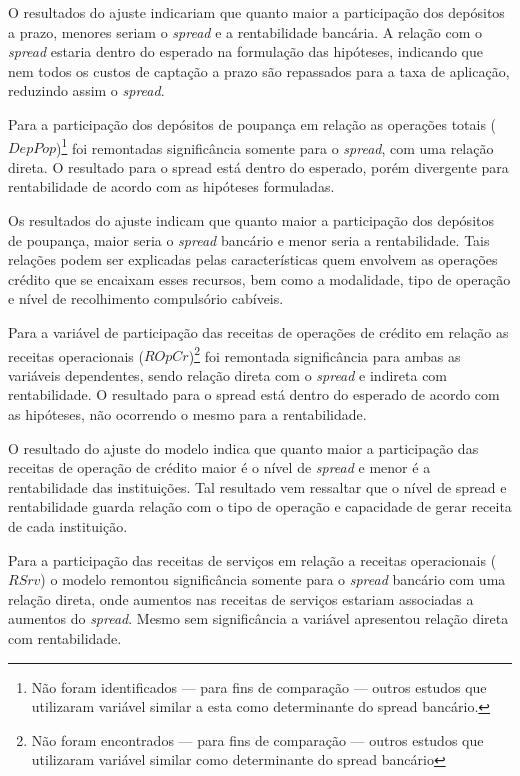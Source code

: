 \documentclass[
  12pt,
  12pt,
  openright,
  oneside,
  a4paper,
  chapter=TITLE,
  section=TITLE,
  subsection=TITLE,
  subsubsection=TITLE,
  english,
  portugues,
  sumario=tradicional]{abntex2}
\begin{document}
O resultados do ajuste indicariam que quanto maior a participação dos depósitos a prazo, menores seriam o \emph{spread} e a rentabilidade bancária. A relação com o \emph{spread} estaria dentro do esperado na formulação das hipóteses, indicando que nem todos os custos de captação a prazo são repassados para a taxa de aplicação, reduzindo assim o \emph{spread}.

Para a participação dos depósitos de poupança em relação as operações totais (\(DepPop\))\footnote{Não foram identificados — para fins de comparação — outros estudos que utilizaram variável similar a esta como determinante do spread bancário.} foi remontadas significância somente para o \emph{spread}, com uma relação direta. O resultado para o spread está dentro do esperado, porém divergente para rentabilidade de acordo com as hipóteses formuladas.

Os resultados do ajuste indicam que quanto maior a participação dos depósitos de poupança, maior seria o \emph{spread} bancário e menor seria a rentabilidade. Tais relações podem ser explicadas pelas características quem envolvem as operações crédito que se encaixam esses recursos, bem como a modalidade, tipo de operação e nível de recolhimento compulsório cabíveis.

Para a variável de participação das receitas de operações de crédito em relação as receitas operacionais (\(ROpCr\))\footnote{Não foram encontrados — para fins de comparação — outros estudos que utilizaram variável similar como determinante do spread bancário} foi remontada significância para ambas as variáveis dependentes, sendo relação direta com o \emph{spread} e indireta com rentabilidade. O resultado para o spread está dentro do esperado de acordo com as hipóteses, não ocorrendo o mesmo para a rentabilidade.

O resultado do ajuste do modelo indica que quanto maior a participação das receitas de operação de crédito maior é o nível de \emph{spread} e menor é a rentabilidade das instituições. Tal resultado vem ressaltar que o nível de spread e rentabilidade guarda relação com o tipo de operação e capacidade de gerar receita de cada instituição.

Para a participação das receitas de serviços em relação a receitas operacionais (\(RSrv\)) o modelo remontou significância somente para o \emph{spread} bancário com uma relação direta, onde aumentos nas receitas de serviços estariam associadas a aumentos do \emph{spread}. Mesmo sem significância a variável apresentou relação direta com rentabilidade.
\end{document}
